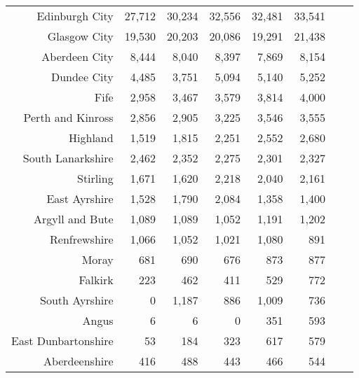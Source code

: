 \documentclass[
  12pt,
]{article}
\begin{document}
\begin{longtable}[t]{rrrrrrrr}
\endfoot
\bottomrule
\endlastfoot
Edinburgh City & 27,712 & 30,234 & 32,556 & 32,481 & 33,541 & \cellcolor{white}{  3.3\%} & \cellcolor{white}{  4.9\%}\\
Glasgow City & 19,530 & 20,203 & 20,086 & 19,291 & 21,438 & \cellcolor{white}{ 11.1\%} & \cellcolor{white}{  2.4\%}\\
Aberdeen City & 8,444 & 8,040 & 8,397 & 7,869 & 8,154 & \cellcolor{white}{  3.6\%} & \cellcolor{white}{ -0.9\%}\\
Dundee City & 4,485 & 3,751 & 5,094 & 5,140 & 5,252 & \cellcolor{white}{  2.2\%} & \cellcolor{white}{  4.0\%}\\
Fife & 2,958 & 3,467 & 3,579 & 3,814 & 4,000 & \cellcolor{white}{  4.9\%} & \cellcolor{white}{  7.8\%}\\
Perth and Kinross & 2,856 & 2,905 & 3,225 & 3,546 & 3,555 & \cellcolor{white}{  0.3\%} & \cellcolor{white}{  5.6\%}\\
Highland & 1,519 & 1,815 & 2,251 & 2,552 & 2,680 & \cellcolor{white}{  5.0\%} & \cellcolor{white}{ 15.3\%}\\
South Lanarkshire & 2,462 & 2,352 & 2,275 & 2,301 & 2,327 & \cellcolor{white}{  1.1\%} & \cellcolor{white}{ -1.4\%}\\
Stirling & 1,671 & 1,620 & 2,218 & 2,040 & 2,161 & \cellcolor{white}{  5.9\%} & \cellcolor{white}{  6.6\%}\\
East Ayrshire & 1,528 & 1,790 & 2,084 & 1,358 & 1,400 & \cellcolor{white}{  3.1\%} & \cellcolor{white}{ -2.2\%}\\
Argyll and Bute & 1,089 & 1,089 & 1,052 & 1,191 & 1,202 & \cellcolor{white}{  0.9\%} & \cellcolor{white}{  2.5\%}\\
Renfrewshire & 1,066 & 1,052 & 1,021 & 1,080 & 891 & \cellcolor{white}{-17.5\%} & \cellcolor{white}{ -4.4\%}\\
Moray & 681 & 690 & 676 & 873 & 877 & \cellcolor{white}{  0.5\%} & \cellcolor{white}{  6.5\%}\\
Falkirk & 223 & 462 & 411 & 529 & 772 & \cellcolor{white}{ 45.9\%} & \cellcolor{white}{ 36.4\%}\\
South Ayrshire & 0 & 1,187 & 886 & 1,009 & 736 & \cellcolor{white}{-27.1\%} & \cellcolor{white}{}\\
Angus & 6 & 6 & 0 & 351 & 593 & \cellcolor{white}{ 68.9\%} & \cellcolor{white}{215.3\%}\\
East Dunbartonshire & 53 & 184 & 323 & 617 & 579 & \cellcolor{white}{ -6.2\%} & \cellcolor{white}{ 81.8\%}\\
Aberdeenshire & 416 & 488 & 443 & 466 & 544 & \cellcolor{white}{ 16.7\%} & \cellcolor{white}{  6.9\%}\\

\end{longtable}
\end{document}
